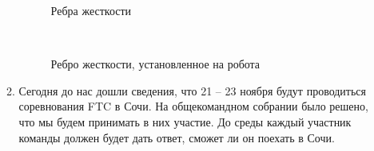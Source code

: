 \begin{enumerate}
\begin{enumerate}
      \begin{figure}[H]
      	\begin{minipage}[h]{0.47\linewidth}
      		\caption{Ребра жесткости}  
      	\end{minipage}
      	\hfill
      	\begin{minipage}[h]{0.47\linewidth}
      		\caption{Ребро жесткости, установленное на робота}
      	\end{minipage}
      \end{figure}
      
      \item Сегодня до нас дошли сведения, что 21 – 23 ноября будут проводиться соревнования FTC в Сочи. На общекомандном собрании было решено, что мы будем принимать в них участие. До среды каждый участник команды должен будет дать ответ, сможет ли он поехать в Сочи.\newline
      

\end{enumerate}
\end{enumerate}
